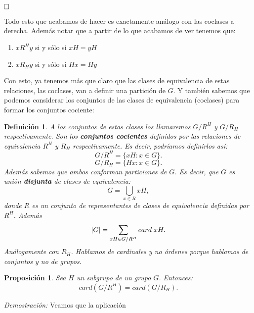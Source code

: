 \documentclass[12pt]{article}
\newtheorem{proposition}[theorem]{Proposición}
\newtheorem{definition}[theorem]{Definición}
\begin{document}
$\hfill \square$

Todo esto que acabamos de hacer es exactamente análogo con las coclases a derecha. Además notar que a partir de lo que acabamos de ver tenemos que: 

\begin{enumerate}
\item $xR^{H}y$ si y sólo si $xH = yH$
\item $xR_{H}y$ si y sólo si $Hx = Hy$
\end{enumerate}

Con esto, ya tenemos más que claro que las clases de equivalencia de estas relaciones, las coclases, van a definir una partición de $G$. Y también sabemos que podemos considerar los conjuntos de las clases de equivalencia (coclases) para formar los conjuntos cociente:

\begin{definition}A los conjuntos de estas clases los llamaremos $G/R^{H}$ y $G/R_{H}$ respectivamente. Son los \textbf{conjuntos cocientes} definidos por las relaciones de equivalencia $R^{H}$ y $R_{H}$ respectivamente. Es decir, podríamos definirlos así: $$G/R^{H} = \lbrace xH : x \in G \rbrace.$$ $$G/R_{H} = \lbrace Hx: x \in G \rbrace.$$ Además sabemos que ambos conforman particiones de $G$. Es decir, que $G$ es unión \textbf{disjunta} de clases de equivalencia:
$$G = \bigcup_{x\in R}xH,$$
donde $R$ es un conjunto de representantes de clases de equivalencia definidas por $R^{H}$. Además $$ |G| = \sum_{xH \in G/R^{H}} card \hspace{0.1cm} xH.$$ Análogamente con $R_{H}$. Hablamos de cardinales y no órdenes porque hablamos de conjuntos y no de grupos. 
\end{definition}

\begin{proposition}
Sea $H$ un subgrupo de un grupo $G$. Entonces:
$$card(G/R^{H})= card(G/R_{H}).$$
\end{proposition}
\emph{Demostración: } Veamos que la aplicación
\end{document}
